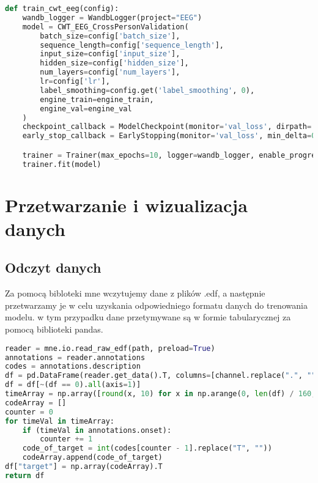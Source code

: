 \documentclass[12pt,twoside]{article}
\begin{document}
\begin{lstlisting}[language=Python, caption=Integracja Ray i RAITune w treningu modelu CWT\_EEG]
def train_cwt_eeg(config):
    wandb_logger = WandbLogger(project="EEG")
    model = CWT_EEG_CrossPersonValidation(
        batch_size=config['batch_size'],
        sequence_length=config['sequence_length'],
        input_size=config['input_size'],
        hidden_size=config['hidden_size'],
        num_layers=config['num_layers'],
        lr=config['lr'],
        label_smoothing=config.get('label_smoothing', 0),
        engine_train=engine_train,
        engine_val=engine_val
    )
    checkpoint_callback = ModelCheckpoint(monitor='val_loss', dirpath='model_checkpoints', filename='model-{epoch:02d}-{val_loss:.2f}', save_top_k=3, mode='min')
    early_stop_callback = EarlyStopping(monitor='val_loss', min_delta=0.00, patience=3, verbose=True, mode='min')

    trainer = Trainer(max_epochs=10, logger=wandb_logger, enable_progress_bar=False, callbacks=[checkpoint_callback, early_stop_callback, TuneReportCallback({"loss": "ptl/val_loss"}, on="validation_end")])
    trainer.fit(model)
\end{lstlisting}


\section{Przetwarzanie i wizualizacja danych}
\subsection{Odczyt danych}
Za pomocą bibloteki mne wczytujemy dane z plików .edf, a następnie przetwarzamy je w celu uzyskania odpowiedniego formatu danych do trenowania modelu. w tym przypadku dane przetymywane są w formie tabularycznej za pomocą biblioteki pandas.

\begin{lstlisting}[language=Python,caption={Odczyt z plików .edf do DataFrame za pomocą mne oraz pandas},label={lst:read_data}]
reader = mne.io.read_raw_edf(path, preload=True)
annotations = reader.annotations  
codes = annotations.description  
df = pd.DataFrame(reader.get_data().T, columns=[channel.replace(".", "") for channel in reader.ch_names])  
df = df[~(df == 0).all(axis=1)] 
timeArray = np.array([round(x, 10) for x in np.arange(0, len(df) / 160, 0.00625)])
codeArray = []
counter = 0
for timeVal in timeArray:
    if (timeVal in annotations.onset):
        counter += 1
    code_of_target = int(codes[counter - 1].replace("T", ""))
    codeArray.append(code_of_target)
df["target"] = np.array(codeArray).T
return df
\end{lstlisting}
\end{document}
